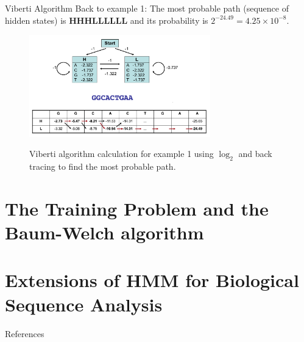 \documentclass{beamer}
\begin{document}
\begin{frame}{Viberti Algorithm}
	Back to example 1: The most probable path (sequence of hidden states) is \textbf{HHHLLLLLL} and its probability is $2^{-24.49} = 4.25 \times 10^{-8}$.
	\begin{figure}
		\centering
		\includegraphics[width = 0.7\textwidth]{example1cal.png}
		\label{fig:example2cal}
		\caption{Viberti algorithm calculation for example 1 using $\log_2$ and back tracing to find the most probable path.}
	\end{figure}
\end{frame}

\section{The Training Problem and the Baum-Welch algorithm}
\section{Extensions of HMM for Biological Sequence Analysis}
\begin{frame}{References}
	
	
\end{frame}
\end{document}
